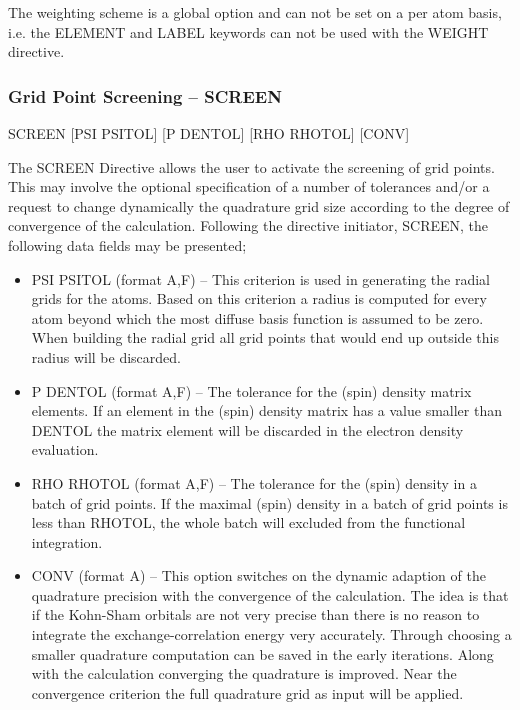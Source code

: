 \documentclass[11pt,fleqn]{article}
\begin{document}
The weighting scheme is a global option and can not be set on a per atom basis,
i.e. the ELEMENT and LABEL keywords can not be used with the WEIGHT directive.


\subsubsection{Grid Point Screening -- SCREEN}

    SCREEN [PSI PSITOL] [P DENTOL] [RHO RHOTOL] [CONV]

The SCREEN Directive allows the user to activate the screening of grid points.
This may involve the optional specification of a number of tolerances and/or
a request to change dynamically the quadrature grid size according to the
degree of convergence of the calculation.  Following the directive initiator, 
SCREEN, the following data fields may be presented;
\begin{itemize}
\item PSI PSITOL (format A,F) -- 
This criterion is used in generating the radial grids for the atoms. 
Based on this criterion a radius is computed for every atom beyond which
the most diffuse basis function is assumed to be zero. When building the
radial grid all grid points that would end up outside this radius will be
discarded. 

\item P DENTOL (format A,F) -- 
The tolerance for the (spin) density matrix elements. If an element in the
(spin) density matrix has a value smaller than DENTOL the matrix element will
be discarded in the electron density evaluation.

\item RHO RHOTOL (format A,F) -- 
The tolerance for the (spin) density in a batch of grid points. If the
maximal (spin) density in a batch of grid points is less than RHOTOL, the
whole batch will excluded from the functional integration.

\item CONV (format A) -- 
This option switches on the dynamic adaption of the quadrature precision 
with the convergence of the calculation. The idea is that if the Kohn-Sham
orbitals are not very precise than there is no reason to integrate the
exchange-correlation energy very accurately. Through choosing a smaller
quadrature computation can be saved in the early iterations. Along with 
the calculation converging the quadrature is improved. Near the convergence
criterion the full quadrature grid as input will be applied.
\end{itemize}
\end{document}
